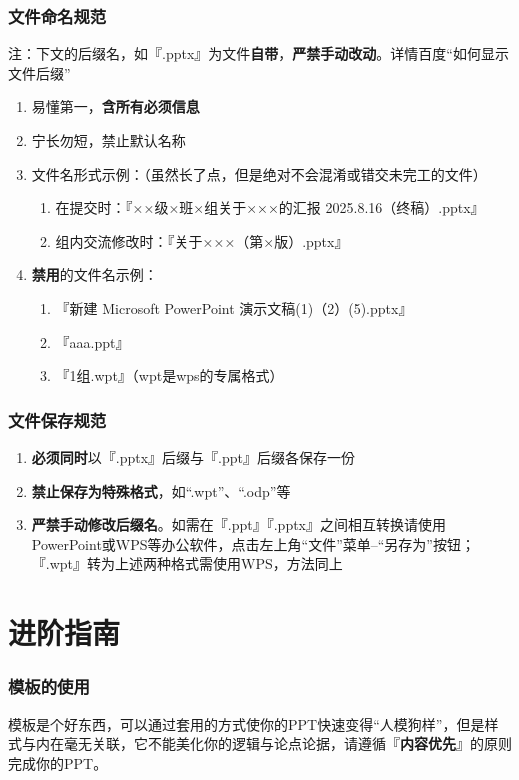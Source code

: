 \section[文件命名规范]{文件命名规范}
注：下文的后缀名，如『.pptx』为文件\textbf{自带}，\textbf{严禁手动改动}。详情百度“如何显示文件后缀”
\begin{enumerate}
    \item 易懂第一，\textbf{含所有必须信息}
    \item 宁长勿短，禁止默认名称
    \item 文件名形式示例：（虽然长了点，但是绝对不会混淆或错交未完工的文件）
          \begin{enumerate}
              \item 在提交时：『××级×班×组关于×××的汇报 2025.8.16（终稿）.pptx』
              \item 组内交流修改时：『关于×××（第×版）.pptx』
          \end{enumerate}
    \item \textbf{禁用}的文件名示例：
          \begin{enumerate}
              \item 『新建 Microsoft PowerPoint 演示文稿(1)（2）(5).pptx』
              \item 『aaa.ppt』
              \item 『1组.wpt』（wpt是wps的专属格式）
          \end{enumerate}
\end{enumerate}

\section[文件保存规范]{文件保存规范}
\begin{enumerate}
    \item \textbf{必须同时}以『.pptx』后缀与『.ppt』后缀各保存一份
    \item \textbf{禁止保存为特殊格式}，如“.wpt”、“.odp”等
    \item \textbf{严禁手动修改后缀名}。如需在『.ppt』『.pptx』之间相互转换请使用PowerPoint或WPS等办公软件，点击左上角“文件”菜单--“另存为”按钮；『.wpt』转为上述两种格式需使用WPS，方法同上
\end{enumerate}

\part[进阶指南]{进阶指南}
\section[模板的使用]{模板的使用}
模板是个好东西，可以通过套用的方式使你的PPT快速变得“人模狗样”，但是样式与内在毫无关联，它不能美化你的逻辑与论点论据，请遵循『\textbf{内容优先}』的原则完成你的PPT。

